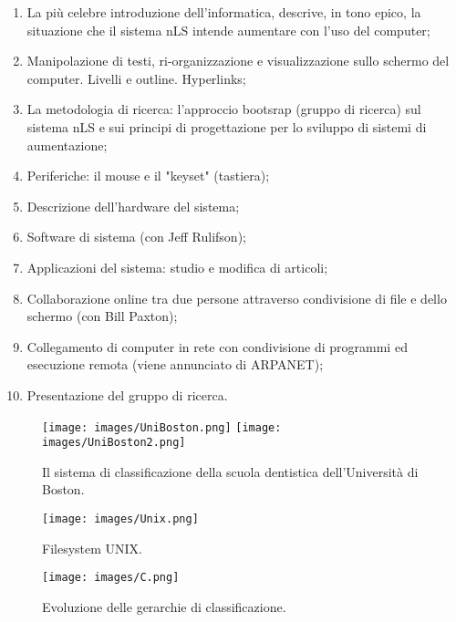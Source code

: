\begin{enumerate}
    \item La più celebre introduzione dell'informatica, descrive, in tono epico,
    la situazione che il sistema nLS intende aumentare con l'uso del computer;
    \item Manipolazione di testi, ri-organizzazione e visualizzazione sullo schermo del 
    computer. Livelli e outline. Hyperlinks;
    \item La metodologia di ricerca: l'approccio bootsrap (gruppo di ricerca) sul sistema nLS
    e sui principi di progettazione per lo sviluppo di sistemi di aumentazione;
    \item Periferiche: il mouse e il "keyset" (tastiera);
    \item Descrizione dell'hardware del sistema;
    \item Software di sistema (con Jeff Rulifson);
    \item Applicazioni del sistema: studio e modifica di articoli;
    \item Collaborazione online tra due persone attraverso condivisione di file e dello schermo (con Bill Paxton);
    \item Collegamento di computer in rete con condivisione di programmi ed esecuzione remota (viene annunciato di ARPANET);
    \item Presentazione del gruppo di ricerca.
\end{enumerate}


\begin{figure}[h]
    \centering
    \texttt{[image: images/UniBoston.png]}
    \texttt{[image: images/UniBoston2.png]}
    \caption{Il sistema di classificazione della scuola dentistica dell'Università di Boston.}
\end{figure}

\pagebreak

\begin{figure}
    \centering
    \texttt{[image: images/Unix.png]}
    \caption{Filesystem UNIX.}
\end{figure}

\begin{figure}
    \centering
    \texttt{[image: images/C.png]}
    \caption{Evoluzione delle gerarchie di classificazione.}
\end{figure}
